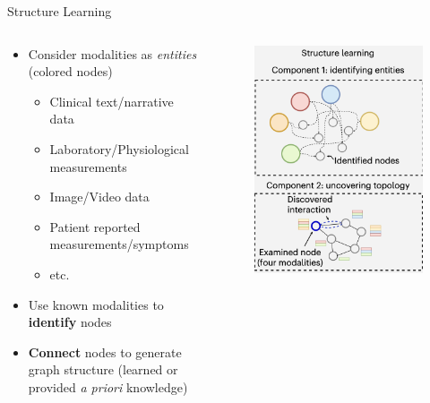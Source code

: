 \documentclass{beamer}
\begin{document}
\begin{frame}{Structure Learning}
    \begin{columns}[T]
    \begin{column}{0.5\textwidth}
        \begin{itemize}
            \item Consider modalities as {\it entities} (colored nodes)
            \begin{itemize}
                \item Clinical text/narrative data 
                \item Laboratory/Physiological measurements 
                \item Image/Video data 
                \item Patient reported measurements/symptoms
                \item etc. 
            \end{itemize}
            \item Use known modalities to \textbf{identify} nodes
            \item \textbf{Connect} nodes to generate graph structure (learned or provided \textit{a priori} knowledge)
        \end{itemize}      
    \end{column}
    \begin{column}{0.5\textwidth}
        \begin{figure}
            \includegraphics[scale=0.4]{Ektefaie_StructureLearning.png}

\end{figure}
\end{column}
\end{columns}
\end{frame}
\end{document}
